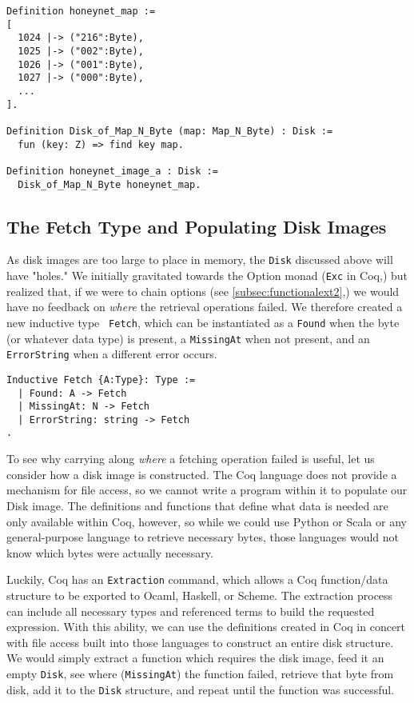 \documentclass[nocopyrightspace]{sigplanconf}
\begin{document}
\begin{lstlisting}
Definition honeynet_map := 
[ 
  1024 |-> ("216":Byte), 
  1025 |-> ("002":Byte),
  1026 |-> ("001":Byte), 
  1027 |-> ("000":Byte), 
  ...
].

Definition Disk_of_Map_N_Byte (map: Map_N_Byte) : Disk :=
  fun (key: Z) => find key map.

Definition honeynet_image_a : Disk := 
  Disk_of_Map_N_Byte honeynet_map.
\end{lstlisting}

\subsection{The Fetch Type and Populating Disk Images}
\label{subsec:fetch}

As disk images are too large to place in memory, the {\tt Disk} discussed
above will have "holes." We initially gravitated towards the Option monad
({\tt Exc} in Coq,) but realized that, if we were to chain options (see
\ref{subsec:functionalext2},) we would have no feedback on {\em where} the
retrieval operations failed. We therefore created a new inductive type {\tt
Fetch}, which can be instantiated as a {\tt Found} when the byte (or whatever
data type) is present, a {\tt MissingAt} when not present, and an {\tt
ErrorString} when a different error occurs.

\begin{lstlisting}
Inductive Fetch {A:Type}: Type :=
  | Found: A -> Fetch
  | MissingAt: N -> Fetch
  | ErrorString: string -> Fetch
.
\end{lstlisting}

To see why carrying along {\em where} a fetching operation failed is useful,
let us consider how a disk image is constructed. The Coq language does not
provide a mechanism for file access, so we cannot write a program within it to
populate our Disk image. The definitions and functions that define what data
is needed are only available within Coq, however, so while we could use Python
or Scala or any general-purpose language to retrieve necessary bytes, those
languages would not know which bytes were actually necessary.

Luckily, Coq has an {\tt Extraction} command, which allows a Coq function/data
structure to be exported to Ocaml, Haskell, or Scheme. The extraction process
can include all necessary types and referenced terms to build the requested
expression. With this ability, we can use the definitions created in Coq in
concert with file access built into those languages to construct an entire
disk structure. We would simply extract a function which requires the disk
image, feed it an empty {\tt Disk}, see where ({\tt MissingAt}) the function
failed, retrieve that byte from disk, add it to the {\tt Disk} structure, and
repeat until the function was successful.
\end{document}
